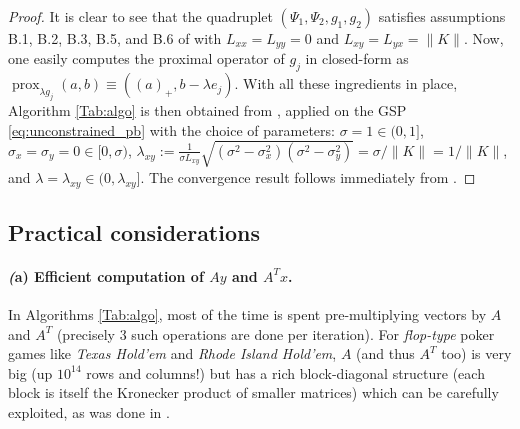 \documentclass[a4paper,9pt]{extarticle}
\DeclareMathOperator{\prox}{prox}
\newtheorem{definition}{Definition}
\begin{document}
\begin{proof}
It is clear to see that the quadruplet $(\Psi_1, \Psi_2, g_1, g_2)$
satisfies assumptions B.1, B.2, B.3, B.5, and B.6 of
\cite{he2013accelerating} with $L_{xx} = L_{yy} = 0$ and $L_{xy} =
L_{yx} = \|K\|$. Now, one easily computes the proximal operator of
$g_j$ in closed-form as $\prox_{\lambda g_j}(a, b) \equiv ((a)_+,
b - \lambda e_j)$. With all these ingredients in place, Algorithm
\ref{Tab:algo} is then obtained from \cite[Algorithm
  T-BD]{he2013accelerating}, applied on the GSP
\eqref{eq:unconstrained_pb} with the choice of parameters: $\sigma = 1
\in (0, 1]$, $\sigma_x = \sigma_y = 0 \in [0, \sigma)$,
    $\lambda_{xy} := \frac{1}{\sigma L_{xy}}\sqrt{(\sigma^2 -
        \sigma_x^2)(\sigma^2 - \sigma_y^2)} = \sigma / \|K\| =
      1/\|K\|$, and $\lambda = \lambda_{xy} \in (0,
      \lambda_{xy}]$. The convergence result follows immediately from
  \cite[Theorem 4.2]{he2013accelerating}.
\end{proof}

\subsection{Practical considerations}
\paragraph*{\textbf{\textit(a) Efficient computation of $Ay$ and $A^Tx$.}}
In Algorithms \ref{Tab:algo}, most of the time is spent
pre-multiplying vectors by $A$ and $A^T$ (precisely 3 such operations
are done per iteration). For \textit{flop-type} poker
games like \textit{Texas Hold'em} and  \textit{Rhode Island Hold'em},
$A$ (and thus $A^T$ too)  is very big (up $10^{14}$ rows and columns!)
but has a rich block-diagonal structure (each block is itself the
Kronecker product of smaller matrices) which can be carefully
exploited, as was done in \cite{hoda2010smoothing}.%


\end{document}
